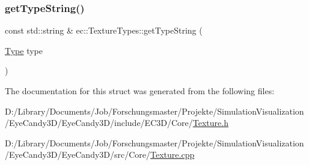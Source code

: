 \subsubsection{\texorpdfstring{get\+Type\+String()}{getTypeString()}}
{\footnotesize\ttfamily const std\+::string \& ec\+::\+Texture\+Types\+::get\+Type\+String (\begin{DoxyParamCaption}\item[{\mbox{\hyperlink{structec_1_1_texture_types_aff67825b98dd1edd7e4783350e866202}{Type}}}]{type }\end{DoxyParamCaption})\hspace{0.3cm}{\ttfamily [static]}}



The documentation for this struct was generated from the following files\+:\begin{DoxyCompactItemize}
\item 
D\+:/\+Library/\+Documents/\+Job/\+Forschungsmaster/\+Projekte/\+Simulation\+Visualization/\+Eye\+Candy3\+D/\+Eye\+Candy3\+D/include/\+E\+C3\+D/\+Core/\mbox{\hyperlink{_texture_8h}{Texture.\+h}}\item 
D\+:/\+Library/\+Documents/\+Job/\+Forschungsmaster/\+Projekte/\+Simulation\+Visualization/\+Eye\+Candy3\+D/\+Eye\+Candy3\+D/src/\+Core/\mbox{\hyperlink{_texture_8cpp}{Texture.\+cpp}}\end{DoxyCompactItemize}
